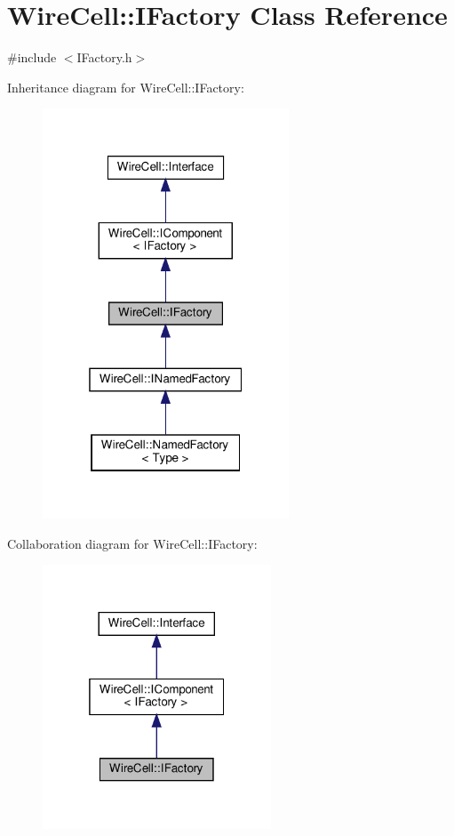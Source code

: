 \hypertarget{class_wire_cell_1_1_i_factory}{}\section{Wire\+Cell\+:\+:I\+Factory Class Reference}
\label{class_wire_cell_1_1_i_factory}


{\ttfamily \#include $<$I\+Factory.\+h$>$}



Inheritance diagram for Wire\+Cell\+:\+:I\+Factory\+:
\nopagebreak
\begin{figure}[H]
\begin{center}
\leavevmode
\includegraphics[width=208pt]{class_wire_cell_1_1_i_factory__inherit__graph}
\end{center}
\end{figure}


Collaboration diagram for Wire\+Cell\+:\+:I\+Factory\+:
\nopagebreak
\begin{figure}[H]
\begin{center}
\leavevmode
\includegraphics[width=193pt]{class_wire_cell_1_1_i_factory__coll__graph}
\end{center}
\end{figure}
